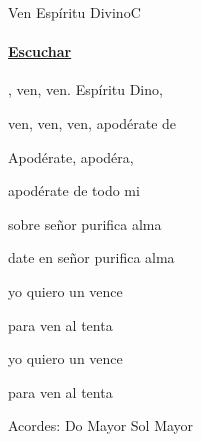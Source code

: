 \documentclass[12pt, spanish]{book}
\newcommand{\NotCCLIed}{\relax}
\begin{document}
    \begin{song}{Ven Espíritu Divino}{C}
        {} %
        {}
        {} %
        {} %
        \ifChordBk
        \paragraph{\mbox{}\hfill\protect\href{https://open.spotify.com/intl-es/track/10MsgqjfsUUpBl264o9V2K}{Escuchar}\mbox{}\hfill}
        \fi


        \begin{SBOpGroup}
            , ven, ven. Espíritu Dino,

            ven, ven, ven, apodérate de 
        \end{SBOpGroup}

        \begin{SBChorus}
            Apodérate, apodéra,

            apodérate de todo mi 
        \end{SBChorus}

        \begin{SBOpGroup}
             sobre  señor purifica  alma

            date en  señor purifica  alma

            yo quiero  un vence

            para ven al tenta

            yo quiero  un vence

            para ven al tenta
        \end{SBOpGroup}

        \ifChordBk
        \begin{SBOpGroup}
            Acordes:\break
            \upchord{\C}\qquad Do Mayor \hfill
            \upchord{\G}\qquad Sol Mayor \hfill\null\break
        \end{SBOpGroup}
        \fi
    \end{song}
\end{document}
